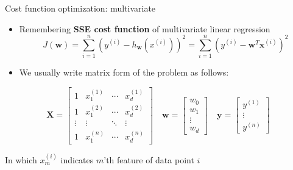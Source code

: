 \documentclass[serif, aspectratio=169]{beamer}
\begin{document}
\begin{frame}{Cost function optimization: multivariate}
    \begin{itemize}
        \item Remembering \textbf{SSE cost function} of multivariate linear regression
            \[
            J(\mathbf{w}) = \sum_{i=1}^{n} \left( y^{(i)} - h_{\mathbf{w}}(x^{(i)}) \right)^2 = \sum_{i=1}^{n} \left( y^{(i)} - \mathbf{w}^T \mathbf{x}^{(i)} \right)^2
            \]
        \item We usually write matrix form of the problem as follows:
        
    \end{itemize}
    
    \[
    \mathbf{X} =
    \begin{bmatrix}
    1 & x_1^{(1)} & \cdots & x_d^{(1)} \\
    1 & x_1^{(2)} & \cdots & x_d^{(2)} \\
    \vdots & \vdots & \ddots & \vdots \\
    1 & x_1^{(n)} & \cdots & x_d^{(n)}
    \end{bmatrix}
    \quad
    \mathbf{w} =
    \begin{bmatrix}
    w_0 \\
    w_1 \\
    \vdots \\
    w_d
    \end{bmatrix}
    \quad
    \mathbf{y} =
    \begin{bmatrix}
    y^{(1)} \\
    \vdots \\
    y^{(n)}
    \end{bmatrix}
    \]
    
    \begin{center}
    In which \( x_m^{(i)} \) indicates \(m \)'th feature of data point \( i\) \\
    \end{center}

\end{frame}
\end{document}
